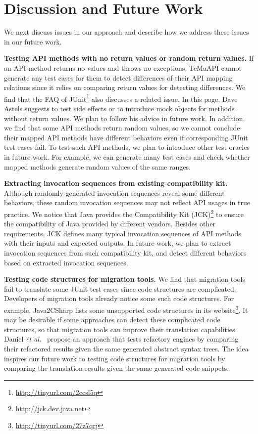 

\section{Discussion and Future Work}
\label{sec:discuss}

We next discuss issues in our approach and describe how we address
these issues in our future work.

\textbf{Testing API methods with no return values or random return values.} If an API method returns no values and throws no exceptions, TeMaAPI cannot generate any test cases for them to detect differences of their API mapping relations since it relies on comparing return values for detecting differences. We find that the FAQ of JUnit\footnote{\url{http://tinyurl.com/2ccsl5q}} also discusses a related issue. In this page, Dave Astels suggests to test side effects or to introduce mock objects for methods without return values. We plan to follow his advice in future work. In addition, we find that some API methods return random values, so we cannot conclude their mapped API methods have different behaviors even if corresponding JUnit test cases fail. To test such API methods, we plan to introduce other test oracles in future work. For example, we can generate many test cases and check whether mapped methods generate random values of the same ranges.

\textbf{Extracting invocation sequences from existing compatibility kit.} Although randomly generated invocation sequences reveal some different behaviors, these random invocation sequences may not reflect API usages in true practice. We notice that Java provides the Compatibility Kit (JCK)\footnote{\url{http://jck.dev.java.net}} to ensure the compatibility of Java provided by different vendors. Besides other requirements, JCK  defines many typical invocation sequences of API methods with their inputs and expected outputs. In future work, we plan to extract invocation sequences from such compatibility kit, and detect different behaviors based on extracted invocation sequences. 

\textbf{Testing code structures for migration tools.} We find that migration tools fail to translate some JUnit test cases since code structures are complicated. Developers of migration tools already notice some such code structures. For example, Java2CSharp lists some unsupported code structures in its website\footnote{\url{http://tinyurl.com/27z7qrj}}. It may be desirable if some approaches can detect these complicated code structures, so that migration tools can improve their translation capabilities. Daniel \emph{et al.}~\cite{daniel2007automated} propose an approach that tests refactory engines by comparing their refactored results given the same generated abstract syntax trees. The idea inspires our future work to testing code structures for migration tools by comparing the translation results given the same generated code snippets. 